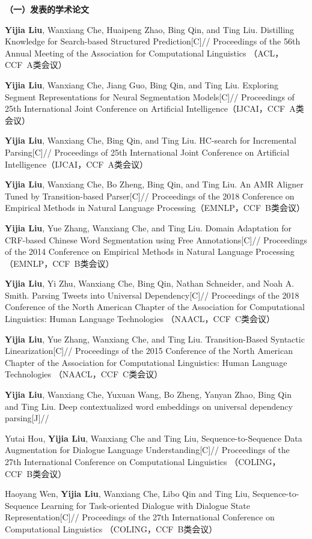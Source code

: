 
\begin{publication}
\noindent\textbf{（一）发表的学术论文}
\begin{publist}
\item \textbf{Yijia Liu}, Wanxiang Che, Huaipeng Zhao, Bing Qin, and Ting Liu. Distilling Knowledge for Search-based Structured Prediction[C]// Proceedings of the 56th Annual Meeting of the Association for Computational Linguistics （ACL，CCF~A类会议）
\item \textbf{Yijia Liu}, Wanxiang Che, Jiang Guo, Bing Qin, and Ting Liu. Exploring Segment Representations for Neural Segmentation Models[C]// Proceedings of 25th International Joint Conference on Artificial Intelligence（IJCAI，CCF~A类会议）
\item \textbf{Yijia Liu}, Wanxiang Che, Bing Qin, and Ting Liu. HC-search for Incremental Parsing[C]// Proceedings of 25th International Joint Conference on Artificial Intelligence（IJCAI，CCF~A类会议）
\item \textbf{Yijia Liu}, Wanxiang Che, Bo Zheng, Bing Qin, and Ting Liu.  An AMR Aligner Tuned by Transition-based Parser[C]// Proceedings of the 2018 Conference on Empirical Methods in Natural Language Processing（EMNLP，CCF~B类会议）
\item \textbf{Yijia Liu}, Yue Zhang, Wanxiang Che, and Ting Liu. Domain Adaptation for CRF-based Chinese Word Segmentation using Free Annotations[C]// Proceedings of the 2014 Conference on Empirical Methods in Natural Language Processing （EMNLP，CCF~B类会议）
\item \textbf{Yijia Liu}, Yi Zhu, Wanxiang Che, Bing Qin, Nathan Schneider, and Noah A. Smith. Parsing Tweets into Universal Dependency[C]// Proceedings of the 2018 Conference of the North American Chapter of the Association for Computational Linguistics: Human Language Technologies （NAACL，CCF~C类会议）
\item \textbf{Yijia Liu}, Yue Zhang, Wanxiang Che, and Ting Liu. Transition-Based Syntactic Linearization[C]// Proceedings of the 2015 Conference of the North American Chapter of the Association for Computational Linguistics: Human Language Technologies （NAACL，CCF~C类会议）
\item \textbf{Yijia Liu}, Wanxiang Che, Yuxuan Wang, Bo Zheng, Yanyan Zhao, Bing Qin and Ting Liu. Deep contextualized word embeddings on universal dependency parsing[J]//
\item Yutai Hou, \textbf{Yijia Liu}, Wanxiang Che and Ting Liu, Sequence-to-Sequence Data Augmentation for Dialogue Language Understanding[C]// Proceedings of the 27th International Conference on Computational Linguistics （COLING，CCF~B类会议）
\item Haoyang Wen, \textbf{Yijia Liu}, Wanxiang Che, Libo Qin and Ting Liu, Sequence-to-Sequence Learning for Task-oriented Dialogue with Dialogue State Representation[C]// Proceedings of the 27th International Conference on Computational Linguistics （COLING，CCF~B类会议）
\end{publist}


\end{publication}
